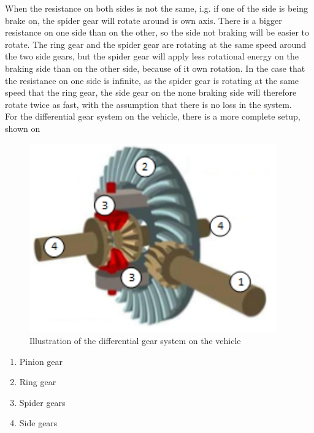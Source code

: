 When the resistance on both sides is not the same, i.g. if one of the side is being brake on, the spider gear will rotate around is own axis. There is a bigger resistance on one side than on the other, so the side not braking will be easier to rotate. The ring gear and the spider gear are rotating at the same speed around the two side gears, but the spider gear will apply less rotational energy on the braking side than on the other side, because of it own rotation. In the case that the resistance on one side is infinite, as the spider gear is rotating at the same speed that the ring gear, the side gear on the none braking side will therefore rotate twice as fast, with the assumption that there is no loss in the system.\\

For the differential gear system on the vehicle, there is a more complete setup, shown on 

\begin{minipage}{\linewidth}
      \centering
      \begin{minipage}{0.65\linewidth}
          \begin{figure}[H]
              \includegraphics[width=0.95\textwidth]{figures/diffGearFull}
              \caption{Illustration of the differential gear system on the vehicle \cite{MechanicalEngineering}}
              \label{diffGearFull}
          \end{figure}
      \end{minipage}
      \hspace{0.05\linewidth}
      \begin{minipage}{0.25\linewidth}
      		\begin{enumerate}
      			\item Pinion gear
      			\item Ring gear
      			\item Spider gears
      			\item Side gears
      		\end{enumerate}
      \end{minipage}
  \end{minipage}




